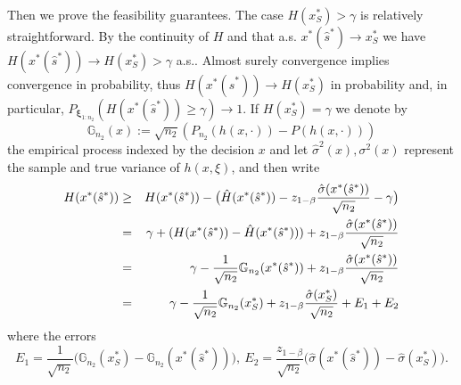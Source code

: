 \documentclass[mnsc,blindrev]{informs4} %
\newcommand{\norm}[1]{\left \Vert #1 \right\Vert}
\begin{document}
Then we prove the feasibility guarantees. The case $H(x_S^*)>\gamma$ is relatively straightforward. By the continuity of $H$ and that a.s. $x^*(\hat s^*)\to x_S^*$ we have $H(x^*(\hat s^*))\to H(x_S^*)>\gamma$ a.s.. Almost surely convergence implies convergence in probability, thus $H(x^*(\hat s^*))\to H(x_S^*)$ in probability and, in particular, $P_{\bm{\xi}_{1:n_2}}(H(x^*(\hat s^*))\geq \gamma)\to 1$. If $H(x_S^*)=\gamma$ we denote by
$$\mathbb G_{n_2}(x):=\sqrt{n_2}(P_{n_2}(h(x,\cdot))-P(h(x,\cdot)))$$
the empirical process indexed by the decision $x$ and let $\hat\sigma^2(x),\sigma^2(x)$ represent the sample and true variance of $h(x,\xi)$, and then write
\begin{eqnarray}
H(x^*(\hat s^*))&\geq& H(x^*(\hat s^*))-\big(\hat H(x^*(\hat s^*))-z_{1-\beta}\frac{\hat \sigma(x^*(\hat s^*))}{\sqrt{n_2}}-\gamma\big)\label{towards tight coverage}\\
\notag&=&\gamma+(H(x^*(\hat s^*))-\hat H(x^*(\hat s^*)))+z_{1-\beta}\frac{\hat \sigma(x^*(\hat s^*))}{\sqrt{n_2}}\\
\notag&=&\gamma-\frac{1}{\sqrt{n_2}}\mathbb G_{n_2}(x^*(\hat s^*))+z_{1-\beta}\frac{\hat \sigma(x^*(\hat s^*))}{\sqrt{n_2}}\\
&=&\gamma-\frac{1}{\sqrt{n_2}}\mathbb G_{n_2}(x_S^*)+z_{1-\beta}\frac{\hat \sigma (x_S^*)}{\sqrt{n_2}}+E_1+E_2\label{representation of constraint value}
\end{eqnarray}
where the errors
\begin{equation*}
E_1= \frac{1}{\sqrt{n_2}}\big(\mathbb G_{n_2}(x_S^*)-\mathbb G_{n_2}(x^*(\hat s^*))\big),\ E_2=\frac{z_{1-\beta}}{\sqrt{n_2}}\big(\hat \sigma(x^*(\hat s^*))-\hat\sigma(x_S^*)\big).
\end{equation*}
\end{document}
